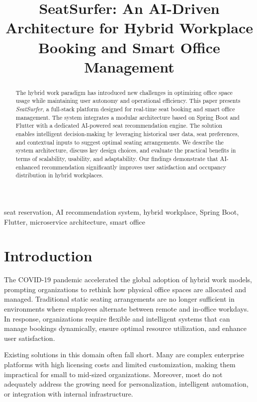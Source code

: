 \documentclass[conference]{IEEEtran}
\title{SeatSurfer: An AI-Driven Architecture for Hybrid Workplace Booking and Smart Office Management}
\author{
    \IEEEauthorblockN{Radu-Matei Prodan}
    \IEEEauthorblockA{
        \textit{Faculty of Mathematics and Computer Science} \\
        \textit{Babeș-Bolyai University}\\
        Cluj-Napoca, Romania \\
        radu-matei.prodan@stud.ubbcluj.ro
    }
}
\begin{document}
\maketitle

\begin{abstract}
The hybrid work paradigm has introduced new challenges in optimizing office space usage while maintaining user autonomy and operational efficiency. This paper presents \textit{SeatSurfer}, a full-stack platform designed for real-time seat booking and smart office management. The system integrates a modular architecture based on Spring Boot and Flutter with a dedicated AI-powered seat recommendation engine. The solution enables intelligent decision-making by leveraging historical user data, seat preferences, and contextual inputs to suggest optimal seating arrangements. We describe the system architecture, discuss key design choices, and evaluate the practical benefits in terms of scalability, usability, and adaptability. Our findings demonstrate that AI-enhanced recommendation significantly improves user satisfaction and occupancy distribution in hybrid workplaces.
\end{abstract}

\begin{IEEEkeywords}
seat reservation, AI recommendation system, hybrid workplace, Spring Boot, Flutter, microservice architecture, smart office
\end{IEEEkeywords}

\section{Introduction}

The COVID-19 pandemic accelerated the global adoption of hybrid work models, prompting organizations to rethink how physical office spaces are allocated and managed. Traditional static seating arrangements are no longer sufficient in environments where employees alternate between remote and in-office workdays. In response, organizations require flexible and intelligent systems that can manage bookings dynamically, ensure optimal resource utilization, and enhance user satisfaction.

Existing solutions in this domain often fall short. Many are complex enterprise platforms with high licensing costs and limited customization, making them impractical for small to mid-sized organizations. Moreover, most do not adequately address the growing need for personalization, intelligent automation, or integration with internal infrastructure.
\end{document}
